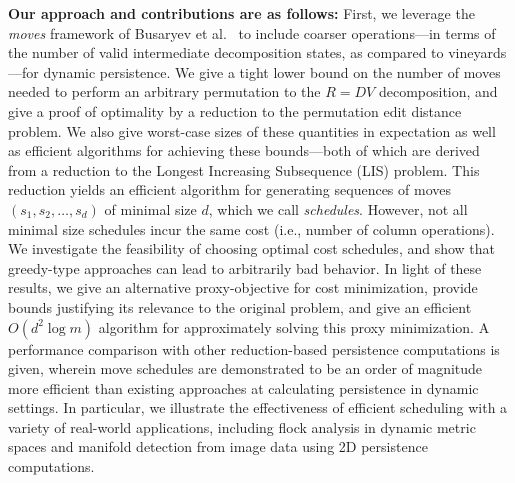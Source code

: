 \documentclass[sn-mathphys]{sn-jnl}
\begin{document}
\textbf{Our approach and contributions are as follows:} First, we leverage the \emph{moves} framework of Busaryev et al.~\cite{busaryev2010tracking} to include  coarser  operations---in terms of the number of valid intermediate decomposition states, as compared to vineyards---for dynamic persistence. 
We give a tight lower bound on the number of moves needed to perform an arbitrary permutation to the $R = D V$ decomposition, and give a proof of optimality by a reduction to the permutation edit distance problem.
We also give worst-case sizes of these quantities in expectation as well as efficient algorithms for achieving these bounds---both of which are derived from a reduction to the Longest Increasing Subsequence (LIS) problem. 
This reduction yields an efficient algorithm for generating sequences of moves $( s_1, s_2, \dots, s_d )$ of minimal size $d$, which we call \emph{schedules}. 
However, not all minimal size schedules incur the same  cost 
(i.e., number of column operations).
We investigate the feasibility of choosing optimal cost schedules, and show that 
greedy-type approaches can lead to arbitrarily bad behavior. 
In light of these results, we give an alternative proxy-objective for cost minimization, provide bounds justifying its relevance to the original problem, and give an efficient $O(d^2 \log m)$ algorithm for approximately solving this proxy minimization. 
A performance comparison with other reduction-based persistence computations is given, wherein move schedules are demonstrated to be an order of magnitude more efficient than existing approaches at calculating persistence in dynamic settings. In particular, we illustrate the effectiveness of efficient scheduling with a variety of real-world applications, including flock analysis in dynamic metric spaces and manifold detection from image data using 2D persistence computations. 
  
\end{document}
